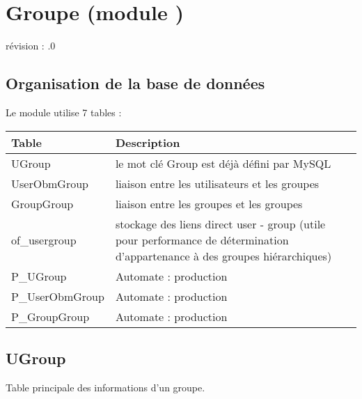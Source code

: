 

\clearpage
\section{Groupe (module \group)}

révision : .0\\

\subsection{Organisation de la base de données}

Le module \group utilise 7 tables :

\begin{tabular}{|p{3cm}|p{11cm}|}
\hline
\textbf{Table} & \textbf{Description} \\
\hline
UGroup & le mot clé Group est déjà défini par MySQL \\
\hline
UserObmGroup & liaison entre les utilisateurs et les groupes \\
\hline
GroupGroup & liaison entre les groupes et les groupes \\
\hline
of\_usergroup & stockage des liens direct user - group (utile pour performance de détermination d'appartenance à des groupes hiérarchiques) \\
\hline
P\_UGroup & Automate : production \\
\hline
P\_UserObmGroup & Automate : production \\
\hline
P\_GroupGroup & Automate : production \\
\hline
\end{tabular}


\subsection{UGroup}
Table principale des informations d'un groupe. \\

